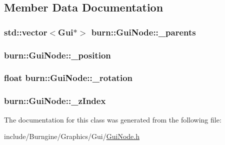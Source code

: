 \subsection{Member Data Documentation}
\hypertarget{classburn_1_1_gui_node_af37b701f475d8046a3f864df6e39faf4}{
\subsubsection[{\-\_\-parents}]{\setlength{\rightskip}{0pt plus 5cm}std\-::vector$<${\bf Gui}$\ast$$>$ burn\-::\-Gui\-Node\-::\-\_\-parents\hspace{0.3cm}{\ttfamily [protected]}}}\label{classburn_1_1_gui_node_af37b701f475d8046a3f864df6e39faf4}
\hypertarget{classburn_1_1_gui_node_a3047fb0cd29eb1cbc1a4ca5569b3d1bb}{
\subsubsection[{\-\_\-position}]{ burn\-::\-Gui\-Node\-::\-\_\-position\hspace{0.3cm}{\ttfamily [protected]}}}\label{classburn_1_1_gui_node_a3047fb0cd29eb1cbc1a4ca5569b3d1bb}
\hypertarget{classburn_1_1_gui_node_aee62a004027766c6e7fd8947f150e759}{
\subsubsection[{\-\_\-rotation}]{\setlength{\rightskip}{0pt plus 5cm}float burn\-::\-Gui\-Node\-::\-\_\-rotation\hspace{0.3cm}{\ttfamily [protected]}}}\label{classburn_1_1_gui_node_aee62a004027766c6e7fd8947f150e759}
\hypertarget{classburn_1_1_gui_node_a0ff802eeb35c2c27b9850cbd59449923}{
\subsubsection[{\-\_\-z\-Index}]{ burn\-::\-Gui\-Node\-::\-\_\-z\-Index\hspace{0.3cm}{\ttfamily [protected]}}}\label{classburn_1_1_gui_node_a0ff802eeb35c2c27b9850cbd59449923}


The documentation for this class was generated from the following file\-:\begin{DoxyCompactItemize}
\item 
include/\-Burngine/\-Graphics/\-Gui/\hyperlink{_gui_node_8h}{Gui\-Node.\-h}\end{DoxyCompactItemize}
